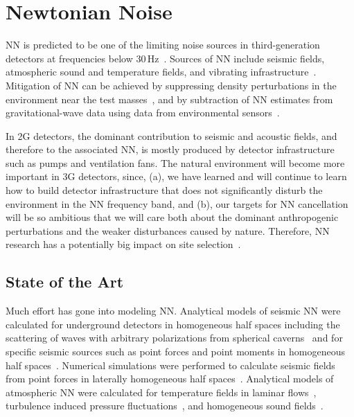 
\chapter{Newtonian Noise}
\label{sec:Newtonian_Noise}
\vspace{0.5cm}
\Acf{NN} is predicted to be one of the limiting noise sources in third-generation detectors at frequencies below 30\,Hz~\cite{Saulson:NN,Har2015}. Sources of \ac{NN} include seismic fields, atmospheric sound and temperature fields, and vibrating infrastructure~\cite{HuTh1998,BeEA1998,Cre2008,FiEA2018,Har2015}. Mitigation of \ac{NN} can be achieved by suppressing density perturbations in the environment near the test masses~\cite{HaHi2014}, and by subtraction of \ac{NN} estimates from gravitational-wave data using data from environmental sensors~\cite{Cel2000,CoEA2016a}.

\begin{samepage} %

In \ac{2G} detectors, the dominant contribution to seismic and acoustic fields, and therefore to the associated \ac{NN}, is mostly produced by detector infrastructure such as pumps and ventilation fans. The natural environment will become more important in \ac{3G} detectors, since, (a), we have learned and will continue to learn how to build detector infrastructure that does not significantly disturb the environment in the \ac{NN} frequency band, and (b), our targets for \ac{NN} cancellation will be so ambitious that we will care both about the dominant anthropogenic perturbations and the weaker disturbances caused by nature. Therefore, \ac{NN} research has a potentially big impact on site selection~\cite{BeEA2010}. 


\section{State of the Art}
Much effort has gone into modeling \ac{NN}. Analytical models of seismic \ac{NN} were calculated for underground detectors in homogeneous half spaces including the scattering of waves with arbitrary polarizations from spherical caverns~\cite{Har2015} and for specific seismic sources such as point forces and point moments in homogeneous half spaces~\cite{HaEA2015,Har2016}. Numerical simulations were performed to calculate seismic fields from point forces in laterally homogeneous half spaces~\cite{BeEA2010c}. Analytical models of atmospheric \ac{NN} were calculated for temperature fields in laminar flows~\cite{Cre2008}, turbulence induced pressure fluctuations~\cite{Har2015}, and homogeneous sound fields~\cite{FiEA2018}. 

\end{samepage} %

